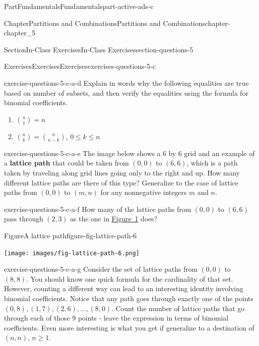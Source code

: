 \documentclass[oneside,10pt,]{book}
\newcommand{\terminology}[1]{\textbf{#1}}
\numberwithin{equation}{section}
\begin{document}
\begin{partptx}{Part}{Fundamentals}{}{Fundamentals}{}{}{part-active-ads-c}
\begin{chapterptx}{Chapter}{Partitions and Combinations}{}{Partitions and Combinations}{}{}{chapter-chapter_5}
\begin{sectionptx}{Section}{In-Class Exercises}{}{In-Class Exercises}{}{}{section-questions-5}
\begin{exercises-subsection-numberless}{Exercises}{Exercises}{}{Exercises}{}{}{exercises-questions-5-c}
\begin{exercisegroup}
\begin{divisionexerciseeg}{4}{}{}{exercise-questions-5-c-a-d}
Explain in words why the following equalities are true based on number of subsets,  and then verify the equalities using the formula for binomial coefficients.%
\par
%
\begin{enumerate}[label=(\alph*)]
\item{}\(\displaystyle \binom{n}{1} = n\)%
\item{}\(\binom{n}{k} = \binom{n}{n-k}\), \(0 \leq k \leq n\)%
\end{enumerate}
%
\end{divisionexerciseeg}%
\begin{divisionexerciseeg}{5}{}{}{exercise-questions-5-c-a-e}%
The image below shows a 6 by 6 grid and an example of a \terminology{lattice path} that could be taken from \((0,0)\)  to \((6,6)\), which is a path taken by traveling along grid lines going only to the right and up. How many different lattice paths are there of this type?  Generalize to the case of lattice paths from \((0,0)\) to \((m,n)\)  for any nonnegative integers \(m\) and \(n\).%
\end{divisionexerciseeg}%
\begin{divisionexerciseeg}{6}{}{}{exercise-questions-5-c-a-f}%
How many of the lattice paths from \((0,0)\) to \((6,6)\) pass through \((2,3)\) as the one in \hyperref[figure-fig-lattice-path-6]{Figure~1} does?%
\begin{figureptx}{Figure}{A lattice path}{figure-fig-lattice-path-6}{}%
\begin{image}{0.25}{0.5}{0.25}{}%
\texttt{[image: images/fig-lattice-path-6.png]}
\end{image}%
\tcblower
\end{figureptx}%
\end{divisionexerciseeg}%
\begin{divisionexerciseeg}{7}{}{}{exercise-questions-5-c-a-g}%
Consider the set of lattice paths from \((0,0)\) to \((8,8)\).  You should know one quick formula for the cardinality of that set.  However, counting a different way can lead to an interesting  identity involving binomial coefficients.  Notice that any path goes through exactly one of the points \((0,8), (1,7), (2,6), \dots , (8,0)\).  Count the number of lattice paths that go through each of those 9 points - leave the expression in terms of binomial coefficients.  Even more interesting is what you get if  generalize to a destination of \((n,n)\), \(n \geq 1\).%
\end{divisionexerciseeg}%
\end{exercisegroup}

\end{exercises-subsection-numberless}
\end{sectionptx}
\end{chapterptx}
\end{partptx}
\end{document}
